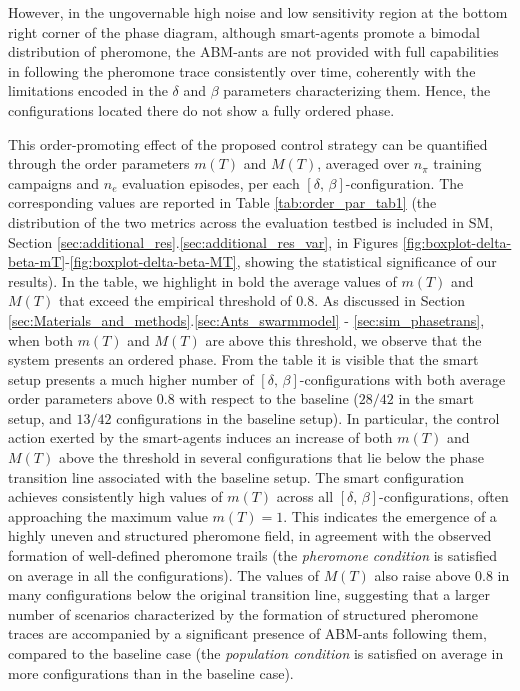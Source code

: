 \documentclass[openacc]{rsproca_new}
\begin{document}
However, in the ungovernable high noise and low sensitivity region at the bottom right corner of the phase diagram, although smart-agents promote a bimodal distribution of pheromone, the ABM-ants are not provided with full capabilities in following the pheromone trace consistently over time, coherently with the limitations encoded in the $\delta$ and $\beta$ parameters characterizing them. Hence, the configurations located there do not show a fully ordered phase. %

This order-promoting effect of the proposed control strategy can be quantified through the order parameters $m(T)$ and $M(T)$, averaged over $n_{\pi}$ training campaigns and $n_{e}$ evaluation episodes, per each $\left[ \delta, \, \beta \right]$-configuration. The corresponding values are reported in Table \ref{tab:order_par_tab1} (the distribution of the two metrics across the evaluation testbed is included in SM, Section \ref{sec:additional_res}.\ref{sec:additional_res_var}, in Figures \ref{fig:boxplot-delta-beta-mT}-\ref{fig:boxplot-delta-beta-MT}, showing the statistical significance of our results). In the table, we highlight in bold the average values of $m(T)$ and $M(T)$ that exceed the empirical threshold of $0.8$. As discussed in Section \ref{sec:Materials_and_methods}.\ref{sec:Ants_swarmmodel} - \ref{sec:sim_phasetrans}, when both $m(T)$ and $M(T)$ are above this threshold, we observe that the system presents an ordered phase. From the table it is visible that the smart setup presents a much higher number of $\left[ \delta, \, \beta \right]$-configurations with both average order parameters above $0.8$ with respect to the baseline ($28/42$ in the smart setup, and $13/42$ configurations in the baseline setup). In particular, the control action exerted by the smart-agents induces an increase of both $m(T)$ and $M(T)$ above the threshold in several configurations that lie below the phase transition line associated with the baseline setup. The smart configuration achieves consistently high values of $m(T)$ across all $\left[ \delta, \, \beta \right]$-configurations, often approaching the maximum value $m(T)=1$. This indicates the emergence of a highly uneven and structured pheromone field, in agreement with the observed formation of well-defined pheromone trails (the \textit{pheromone condition} is satisfied on average in all the configurations). The values of $M(T)$ also raise above $0.8$ in many configurations below the original transition line, suggesting that a larger number of scenarios characterized by the formation of structured pheromone traces are accompanied by a significant presence of ABM-ants following them, compared to the baseline case (the \textit{population condition} is satisfied on average in more configurations than in the baseline case). 
\end{document}
